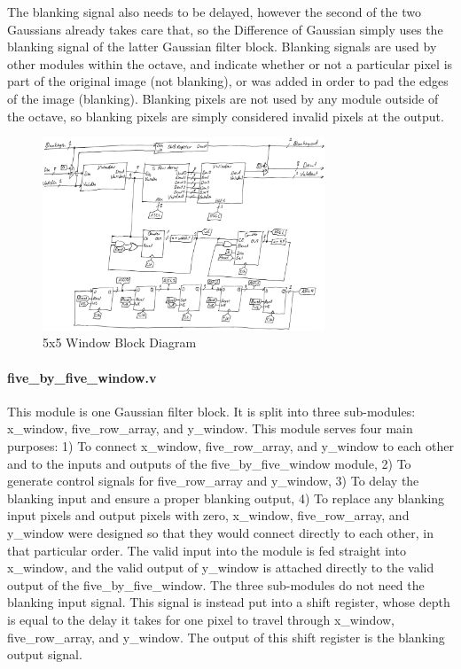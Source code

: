 The blanking signal also needs to be delayed, however the second of the two 
Gaussians already takes care that, so the Difference of Gaussian simply uses the 
blanking signal of the latter Gaussian filter block. Blanking signals are used 
by other modules within the octave, and indicate whether or not a particular 
pixel is part of the original image (not blanking), or was added in order to pad 
the edges of the image (blanking). Blanking pixels are not used by any module 
outside of the octave, so blanking pixels are simply considered invalid pixels 
at the output.


\begin{figure}
    \centering
    \includegraphics[width=0.75\textwidth]{processed_image_pngs/5x5_block.png}
    \caption{5x5 Window Block Diagram}
    \label{fig:five_window}
\end{figure}

\paragraph{five\_by\_five\_window.v}

This module is one Gaussian filter block. It is split into three sub-modules: 
x\_window, five\_row\_array, and y\_window. This module serves four main purposes:
1) To connect x\_window, five\_row\_array, and y\_window to each other and to the 
   inputs and outputs of the five\_by\_five\_window module,
2) To generate control signals for five\_row\_array and y\_window,
3) To delay the blanking input and ensure a proper blanking output,
4) To replace any blanking input pixels and output pixels with zero,
x\_window, five\_row\_array, and y\_window were designed so that they would connect 
directly to each other, in that particular order. The valid input into the 
module is fed straight into x\_window, and the valid output of y\_window is 
attached directly to the valid output of the five\_by\_five\_window.
The three sub-modules do not need the blanking input signal. This signal is 
instead put into a shift register, whose depth is equal to the delay it takes 
for one pixel to travel through x\_window, five\_row\_array, and y\_window. The 
output of this shift register is the blanking output signal.

